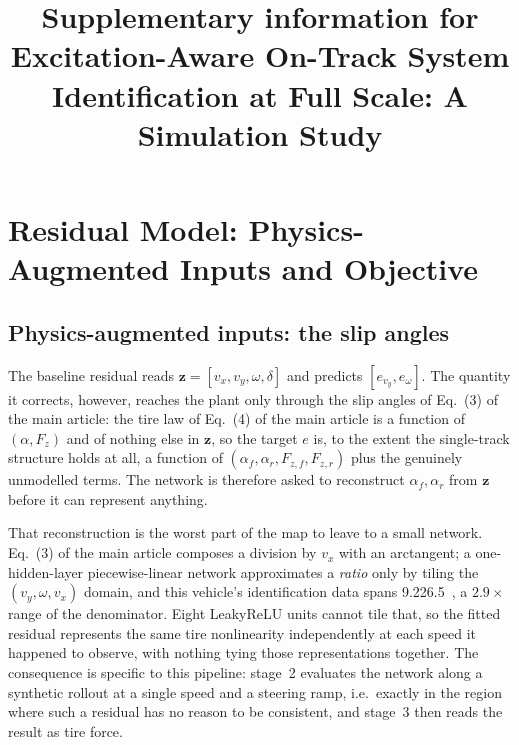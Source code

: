 \documentclass[12pt]{sn-jnl}
\makeatletter
\newif\ifsiu@prev
\DeclareRobustCommand{\siu@sep}{\ifsiu@prev\,\fi}
\DeclareRobustCommand{\siu@unit}[1]{\siu@sep\text{#1}\siu@prevtrue}
\DeclareRobustCommand{\siu@pre}[1]{\siu@sep\text{#1}\siu@prevfalse}
\DeclareRobustCommand{\siu@div}[1]{\text{#1}\siu@prevfalse}
\DeclareRobustCommand{\meter}{m}
\DeclareRobustCommand{\second}{s}
\DeclareRobustCommand{\gram}{g}
\DeclareRobustCommand{\newton}{N}
\DeclareRobustCommand{\radian}{rad}
\DeclareRobustCommand{\hertz}{Hz}
\DeclareRobustCommand{\percent}{\%}
\DeclareRobustCommand{\g}{\textit{g}}
\DeclareRobustCommand{\kilo}{k}
\DeclareRobustCommand{\milli}{m}
\DeclareRobustCommand{\per}{/}
\DeclareRobustCommand{\squared}{\ensuremath{^{2}}}
\providecommand{\degree}{\ensuremath{^{\circ}}}
\DeclareRobustCommand{\si}[1]{\begingroup
  \siu@prevfalse
  \renewcommand{\meter}{\siu@unit{m}}%
  \renewcommand{\second}{\siu@unit{s}}%
  \renewcommand{\gram}{\siu@unit{g}}%
  \renewcommand{\newton}{\siu@unit{N}}%
  \renewcommand{\radian}{\siu@unit{rad}}%
  \renewcommand{\hertz}{\siu@unit{Hz}}%
  \renewcommand{\percent}{\siu@unit{\%}}%
  \renewcommand{\degree}{\siu@unit{\ensuremath{^{\circ}}}}%
  \renewcommand{\g}{\siu@unit{\textit{g}}}%
  \renewcommand{\kilo}{\siu@pre{k}}%
  \renewcommand{\milli}{\siu@pre{m}}%
  \renewcommand{\per}{\siu@div{/}}%
  \renewcommand{\squared}{\ensuremath{^{2}}}%
  #1\endgroup}
\DeclareRobustCommand{\SIrange}[3]{#1\text{--}#2\,\si{#3}}
\newcommand{\vecz}{\mathbf{z}}
\makeatother
\begin{document}
\title[Supplementary information]{Supplementary information for\\
Excitation-Aware On-Track System Identification at Full Scale:
A Simulation Study}


\maketitle

\section{Residual Model: Physics-Augmented Inputs and Objective}
\label{sup:residual}

\subsection{Physics-augmented inputs: the slip angles}
\label{sup:physinputs}
The baseline residual reads $\vecz=[v_{x},v_{y},\omega,\delta]$ and predicts
$[e_{v_{y}},e_{\omega}]$. The quantity it corrects, however, reaches the plant
only through the slip angles of Eq.~(3) of the main article: the tire law of Eq.~(4) of the main article is
a function of $(\alpha,F_{z})$ and of nothing else in $\vecz$, so the target
$e$ is, to the extent the single-track structure holds at all, a function of
$(\alpha_{f},\alpha_{r},F_{z,f},F_{z,r})$ plus the genuinely unmodelled terms.
The network is therefore asked to reconstruct
$\alpha_{f},\alpha_{r}$ from $\vecz$ before it can represent anything.

That reconstruction is the worst part of the map to leave to a small network.
Eq.~(3) of the main article composes a division by $v_{x}$ with an
arctangent; a
one-hidden-layer piecewise-linear network approximates a \emph{ratio} only by
tiling the $(v_{y},\omega,v_{x})$ domain, and this vehicle's identification
data spans \SIrange{9.2}{26.5}{\meter\per\second}, a $2.9\times$ range of the
denominator. Eight LeakyReLU units cannot tile that, so the fitted residual
represents the same tire nonlinearity independently at each speed it happened
to observe, with nothing tying those representations together. The consequence
is specific to this pipeline: stage~2 evaluates the network along a synthetic
rollout at a single speed and a steering ramp, i.e.\ exactly in the region
where such a residual has no reason to be consistent, and stage~3 then reads
the result as tire force.
\end{document}
